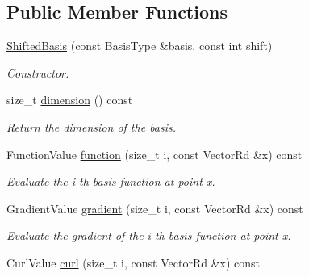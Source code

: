\subsection*{Public Member Functions}
\begin{DoxyCompactItemize}
\item 
\hyperlink{classHArDCore2D_1_1ShiftedBasis_adb935c3f74623dbd29c124c0c6dc605e}{Shifted\+Basis} (const Basis\+Type \&basis, const int shift)
\begin{DoxyCompactList}\small\item\em Constructor. \end{DoxyCompactList}\item 
\mbox{\label{classHArDCore2D_1_1ShiftedBasis_a74ebe98de6bd42447c4743c784e8c601}} 
size\+\_\+t \hyperlink{classHArDCore2D_1_1ShiftedBasis_a74ebe98de6bd42447c4743c784e8c601}{dimension} () const
\begin{DoxyCompactList}\small\item\em Return the dimension of the basis. \end{DoxyCompactList}\item 
\mbox{\label{classHArDCore2D_1_1ShiftedBasis_a73529b85e8d087fdeee582e0744bf49a}} 
Function\+Value \hyperlink{classHArDCore2D_1_1ShiftedBasis_a73529b85e8d087fdeee582e0744bf49a}{function} (size\+\_\+t i, const Vector\+Rd \&x) const
\begin{DoxyCompactList}\small\item\em Evaluate the i-\/th basis function at point x. \end{DoxyCompactList}\item 
\mbox{\label{classHArDCore2D_1_1ShiftedBasis_a7c06ac1c5648d70651308067df98c4c8}} 
Gradient\+Value \hyperlink{classHArDCore2D_1_1ShiftedBasis_a7c06ac1c5648d70651308067df98c4c8}{gradient} (size\+\_\+t i, const Vector\+Rd \&x) const
\begin{DoxyCompactList}\small\item\em Evaluate the gradient of the i-\/th basis function at point x. \end{DoxyCompactList}\item 
\mbox{\label{classHArDCore2D_1_1ShiftedBasis_a7cb372f9d9384f30cecd1beb4b5d62b7}} 
Curl\+Value \hyperlink{classHArDCore2D_1_1ShiftedBasis_a7cb372f9d9384f30cecd1beb4b5d62b7}{curl} (size\+\_\+t i, const Vector\+Rd \&x) const

\end{DoxyCompactItemize}
